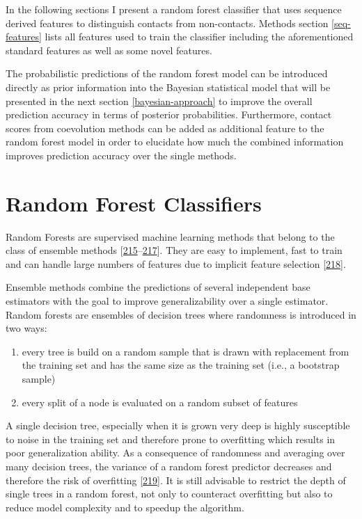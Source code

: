 \documentclass[11pt,a4paper,twoside]{book}
\providecommand{\tightlist}{%
  \setlength{\itemsep}{0pt}\setlength{\parskip}{0pt}}
\theoremstyle{definition}
\theoremstyle{definition}
\theoremstyle{remark}
\begin{document}
In the following sections I present a random forest classifier that uses
sequence derived features to distinguish contacts from non-contacts.
Methods section \ref{seq-features} lists all features used to train the
classifier including the aforementioned standard features as well as
some novel features.

The probabilistic predictions of the random forest model can be
introduced directly as prior information into the Bayesian statistical
model that will be presented in the next section \ref{bayesian-approach}
to improve the overall prediction accuracy in terms of posterior
probabilities. Furthermore, contact scores from coevolution methods can
be added as additional feature to the random forest model in order to
elucidate how much the combined information improves prediction accuracy
over the single methods.

\section{Random Forest Classifiers}\label{random-forest-classifiers}

Random Forests are supervised machine learning methods that belong to
the class of ensemble methods
{[}\protect\hyperlink{ref-Ho1998}{215}--\protect\hyperlink{ref-Breiman2001}{217}{]}.
They are easy to implement, fast to train and can handle large numbers
of features due to implicit feature selection
{[}\protect\hyperlink{ref-Menze2009}{218}{]}.

Ensemble methods combine the predictions of several independent base
estimators with the goal to improve generalizability over a single
estimator. Random forests are ensembles of decision trees where
randomness is introduced in two ways:

\begin{enumerate}
\def\labelenumi{\arabic{enumi}.}
\tightlist
\item
  every tree is build on a random sample that is drawn with replacement
  from the training set and has the same size as the training set (i.e.,
  a bootstrap sample)
\item
  every split of a node is evaluated on a random subset of features
\end{enumerate}

A single decision tree, especially when it is grown very deep is highly
susceptible to noise in the training set and therefore prone to
overfitting which results in poor generalization ability. As a
consequence of randomness and averaging over many decision trees, the
variance of a random forest predictor decreases and therefore the risk
of overfitting {[}\protect\hyperlink{ref-Louppe2014}{219}{]}. It is
still advisable to restrict the depth of single trees in a random
forest, not only to counteract overfitting but also to reduce model
complexity and to speedup the algorithm.
\end{document}
